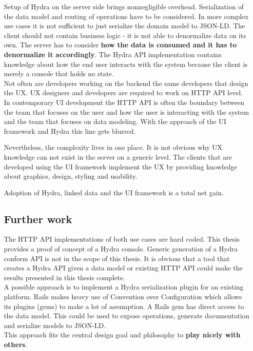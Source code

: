 Setup of Hydra on the server side brings nonnegligible overhead. Serialization of the data model and routing of operations have to be considered. In more complex use cases it is not sufficient to just serialize the domain model to JSON-LD. The client should not contain business logic - it is not able to denormalize data on its own. The server has to consider \textbf{how the data is consumed and it has to denormalize it accordingly}. The Hydra API implementation contains knowledge about how the end user interacts with the system because the client is merely a console that holds no state. \\
Not often are developers working on the backend the same developers that design the UX. UX designers and developers are required to work on HTTP API level. In contemporary UI development the HTTP API is often the boundary between the team that focuses on the user and how the user is interacting with the system and the team that focuses on data modeling. With the approach of the UI framework and Hydra this line gets blurred.

Nevertheless, the complexity lives in one place. It is not obvious why UX knowledge can not exist in the server on a generic level. The clients that are developed using the UI framework implement the UX by providing knowledge about graphics, design, styling and usability.

Adoption of Hydra, linked data and the UI framework is a total net gain.

\subsection{Further work}
The HTTP API implementations of both use cases are hard coded. This thesis provides a proof of concept of a Hydra console. Generic generation of a Hydra conform API is not in the scope of this thesis. It is obvious that a tool that creates a Hydra API given a data model or existing HTTP API could make the results presented in this thesis complete. \\
A possible approach is to implement a Hydra serialization plugin for an existing platform. Rails makes heavy use of Convention over Configuration which allows its plugins (gems) to make a lot of assumption. A Rails gem has direct access to the data model. This could be used to expose operations, generate documentation and serialize models to JSON-LD. \\
This approach fits the central design goal and philosophy to \textbf{play nicely with others}.
